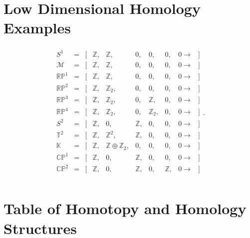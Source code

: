 \hypertarget{low-dimensional-homology-examples}{%
\section{Low Dimensional Homology
Examples}\label{low-dimensional-homology-examples}}

\begin{fact}

\begin{align*}
\begin{array}{cccccccccc}
S^1   &=  &[&{\mathbb{Z}}, &{\mathbb{Z}},               &0,    &0,      &0,    &0\rightarrow & ]\\
{\mathcal{M}}&=  &[&{\mathbb{Z}}, &{\mathbb{Z}},               &0,    &0,      &0,    &0\rightarrow & ]\\
{\mathbb{RP}}^1 &=  &[&{\mathbb{Z}}, &{\mathbb{Z}},               &0,    &0,      &0,    &0\rightarrow & ]\\
{\mathbb{RP}}^2 &=  &[&{\mathbb{Z}}, &{\mathbb{Z}}_{2},             &0,    &0,      &0,    &0\rightarrow & ]\\
{\mathbb{RP}}^3 &=  &[&{\mathbb{Z}}, &{\mathbb{Z}}_{2},             &0,    &{\mathbb{Z}},    &0,    &0\rightarrow & ]\\
{\mathbb{RP}}^4 &=  &[&{\mathbb{Z}}, &{\mathbb{Z}}_{2},             &0,    &{\mathbb{Z}}_{2},  &0,    &0\rightarrow & ]\\
 S^2  &=  &[&{\mathbb{Z}}, &0,                 &{\mathbb{Z}},  &0,      &0,    &0\rightarrow & ]\\
{\mathbb{T}}^2 &=  &[&{\mathbb{Z}}, &{\mathbb{Z}}^2,             &{\mathbb{Z}},  &0,      &0,    &0\rightarrow & ]\\
{\mathbb{K}}&=  &[&{\mathbb{Z}}, &{\mathbb{Z}}\oplus {\mathbb{Z}}_{2},  &0,    &0,      &0,    &0\rightarrow & ]\\
{\mathbb{CP}}^1 &=  &[&{\mathbb{Z}}, &0,                 &{\mathbb{Z}},  &0,      &0,    &0\rightarrow & ]\\
{\mathbb{CP}}^2 &=  &[&{\mathbb{Z}}, &0,                 &{\mathbb{Z}},  &0,      &{\mathbb{Z}},  &0\rightarrow & ]\\
\end{array}
.\end{align*}

\end{fact}

\hypertarget{table-of-homotopy-and-homology-structures}{%
\section{Table of Homotopy and Homology
Structures}\label{table-of-homotopy-and-homology-structures}}

